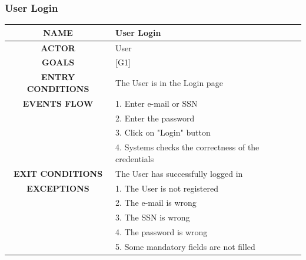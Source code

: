 \documentclass[12pt,a4paper]{article}
\begin{document}
		\subsubsection{User Login}
		\begin{center}
			\begin{tabular}{| c | l |}
				\hline
				\textbf{NAME} & User Login \\
				\hline
				\textbf{ACTOR} & User \\
				\hline
				\textbf{GOALS} & [G1] \\
				\hline
				\textbf{ENTRY CONDITIONS} & The User is in the Login page \\ \hline
				\textbf{EVENTS FLOW}  &
				1. Enter e-mail or SSN\\
				&2. Enter the password\\
				&3. Click on "Login" button\\
				&4. Systems checks the correctness of the credentials\\
				\hline
				\textbf{EXIT CONDITIONS}  & The User has successfully logged in \\ \hline
				\textbf{EXCEPTIONS} & 
				1. The User is not registered\\
				&2. The e-mail is wrong\\
				&3. The SSN is wrong\\
				&4. The password is wrong\\
				&5. Some mandatory fields are not filled\\
				\hline
			\end{tabular}
		\end{center}
	
\end{document}
